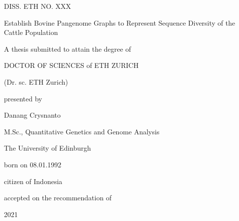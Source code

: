 \documentclass[../main.tex]{subfiles}
\begin{document}
\setlength{\parskip}{0pt}
\begin{center}
    \thispagestyle{empty}

    DISS. ETH NO. XXX 

    \vspace{2cm}

    {\large Establish Bovine Pangenome Graphs to Represent Sequence Diversity of the Cattle Population}

    \vspace{2cm}
    
    \doublespacing
    A thesis submitted to attain the degree of

    DOCTOR OF SCIENCES of ETH ZURICH

    (Dr. sc. ETH Zurich)
    \vspace{1cm}

    presented by

    \vspace{1cm}
    Danang Crysnanto  

    \vspace{1cm}

    M.Sc., Quantitative Genetics and Genome Analysis 
    
    The University of Edinburgh

    \vspace{1cm}

    born on 08.01.1992

    citizen of Indonesia

    \vspace{2cm}

    accepted on the recommendation of     
    \vspace{2cm}

    \vspace{0.5cm}
    2021
\end{center}
\end{document}
